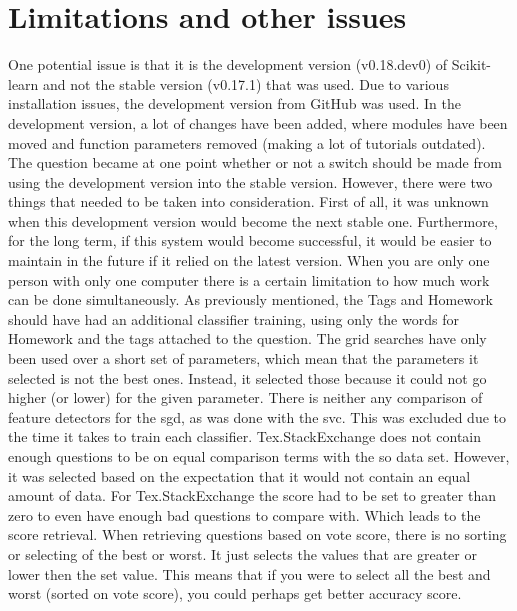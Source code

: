 \section{Limitations and other issues}
\label{sec:limitations_and_issues}
One potential issue is that it is the development version (v0.18.dev0) of Scikit-learn and not the stable version (v0.17.1) that was used.
Due to various installation issues, the development version from GitHub was used.
In the development version, a lot of changes have been added, where modules have been moved and function parameters removed (making a lot of tutorials outdated).
The question became at one point whether or not a switch should be made from using the development version into the stable version.
However, there were two things that needed to be taken into consideration.  
First of all, it was unknown when this development version would become the next stable one.
Furthermore, for the long term, if this system would become successful, it would be easier to maintain in the future if it relied on the latest version.
\vspace{0.5em}\newline
When you are only one person with only one computer there is a certain limitation to how much work can be done simultaneously.
As previously mentioned, the Tags and Homework should have had an additional classifier training, using only the words for Homework and the tags attached to the question.
The grid searches have only been used over a short set of parameters, which mean that the parameters it selected is not the best ones.
Instead, it selected those because it could not go higher (or lower) for the given parameter. 
There is neither any comparison of feature detectors for the \gls{sgd}, as was done with the \gls{svc}.
This was excluded due to the time it takes to train each classifier.
\vspace{0.5em}\newline
Tex.StackExchange does not contain enough questions to be on equal comparison terms with the \gls{so} data set. 
However, it was selected based on the expectation that it would not contain an equal amount of data. 
For Tex.StackExchange the score had to be set to greater than zero to even have enough bad questions to compare with.
Which leads to the score retrieval. 
When retrieving questions based on vote score, there is no sorting or selecting of the best or worst. 
It just selects the values that are greater or lower then the set value. 
This means that if you were to select all the best and worst (sorted on vote score), you could perhaps get better accuracy score.
